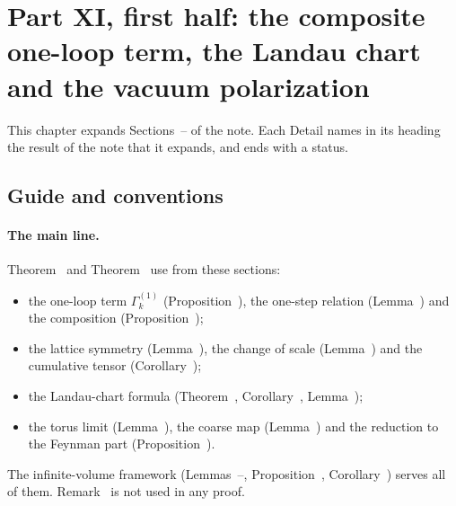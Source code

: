 \section{Part XI, first half: the composite one-loop term, the Landau chart and the vacuum polarization}\label{d11a:sec}

This chapter expands Sections~-- of the note. Each Detail names in its heading the result of the note that it expands, and ends with a status.

\subsection{Guide and conventions}\label{d11a:guide}

\paragraph{The main line.} Theorem~ and Theorem~ use from these sections:
\begin{itemize}
\item the one-loop term $\Gamma^{(1)}_k$ (Proposition~), the one-step relation (Lemma~) and the composition (Proposition~);
\item the lattice symmetry (Lemma~), the change of scale (Lemma~) and the cumulative tensor (Corollary~);
\item the Landau-chart formula (Theorem~, Corollary~, Lemma~);
\item the torus limit (Lemma~), the coarse map (Lemma~) and the reduction to the Feynman part (Proposition~).
\end{itemize}
The infinite-volume framework (Lemmas~--, Proposition~, Corollary~) serves all of them. Remark~ is not used in any proof.

